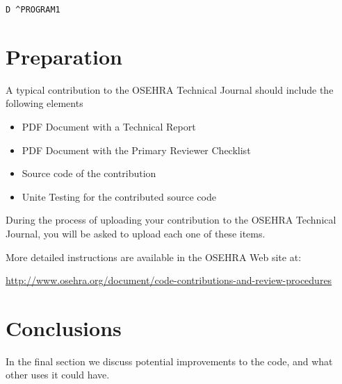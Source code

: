 \documentclass{OSEHRAArticle}
\begin{document}
\begin{verbatim}
D ^PROGRAM1
\end{verbatim}


\section{Preparation}

A typical contribution to the OSEHRA Technical Journal should include the following elements

\begin{itemize}
\item PDF Document with a Technical Report
\item PDF Document with the Primary Reviewer Checklist
\item Source code of the contribution
\item Unite Testing for the contributed source code
\end{itemize}

During the process of uploading your contribution to the OSEHRA Technical
Journal, you will be asked to upload each one of these items.

More detailed instructions are available in the OSEHRA Web site at:

\url{http://www.osehra.org/document/code-contributions-and-review-procedures}


\section{Conclusions}

In the final section we discuss potential improvements to the code, and what
other uses it could have.


%
%



\end{document}
